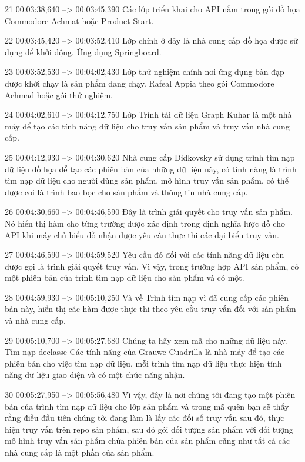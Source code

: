 21
00:03:38,640 --> 00:03:45,390
Các lớp triển khai cho API nằm trong gói đồ họa Commodore Achmat hoặc Product Start.

22
00:03:45,420 --> 00:03:52,410
Lớp chính ở đây là nhà cung cấp đồ họa được sử dụng để khởi động.  Ứng dụng Springboard.

23
00:03:52,530 --> 00:04:02,430
Lớp thử nghiệm chính nơi ứng dụng bàn đạp được khởi chạy là sản phẩm đang chạy.  Rafeal Appia theo gói Commodore Achmad hoặc gói thử nghiệm.

24
00:04:02,610 --> 00:04:12,750
Lớp Trình tải dữ liệu Graph Kuhar là một nhà máy để tạo các tính năng dữ liệu cho truy vấn sản phẩm và truy vấn nhà cung cấp.

25
00:04:12,930 --> 00:04:30,620
Nhà cung cấp Didkovsky sử dụng trình tìm nạp dữ liệu đồ họa để tạo các phiên bản của những dữ liệu này, có tính năng là trình tìm nạp dữ liệu cho người dùng sản phẩm, mô hình truy vấn sản phẩm, có thể được coi là trình bao bọc cho sản phẩm và thông tin nhà cung cấp.

26
00:04:30,660 --> 00:04:46,590
Đây là trình giải quyết cho truy vấn sản phẩm.  Nó hiển thị hàm cho từng trường được xác định trong định nghĩa lược đồ cho API khi máy chủ biểu đồ nhận được yêu cầu thực thi các đại biểu truy vấn.

27
00:04:46,590 --> 00:04:59,520
Yêu cầu đó đối với các tính năng dữ liệu còn được gọi là trình giải quyết truy vấn.  Vì vậy, trong trường hợp API sản phẩm, có một phiên bản của trình tìm nạp dữ liệu cho sản phẩm và có một.

28
00:04:59,930 --> 00:05:10,250
Và về Trình tìm nạp vì đã cung cấp các phiên bản này, hiển thị các hàm được thực thi theo yêu cầu truy vấn đối với sản phẩm và nhà cung cấp.

29
00:05:10,700 --> 00:05:27,680
Chúng ta hãy xem mã cho những dữ liệu này.  Tìm nạp declasse Các tính năng của Grauwe Cuadrilla là nhà máy để tạo các phiên bản cho việc tìm nạp dữ liệu, mỗi trình tìm nạp dữ liệu thực hiện tính năng dữ liệu giao diện và có một chức năng nhận.

30
00:05:27,950 --> 00:05:56,480
Vì vậy, đây là nơi chúng tôi đang tạo một phiên bản của trình tìm nạp dữ liệu cho lớp sản phẩm và trong mã quên bạn sẽ thấy rằng điều đầu tiên chúng tôi đang làm là lấy các đối số truy vấn sau đó, thực hiện truy vấn trên repo sản phẩm, sau đó gói  đối tượng sản phẩm với đối tượng mô hình truy vấn sản phẩm chứa phiên bản của sản phẩm cũng như tất cả các nhà cung cấp là một phần của sản phẩm.

